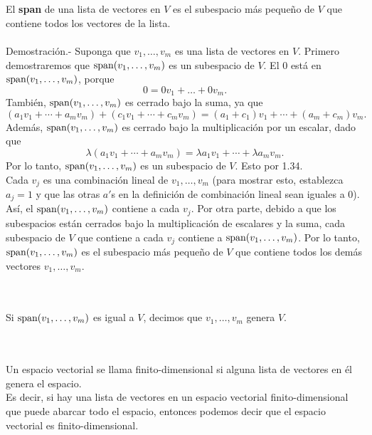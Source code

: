 \setcounter{myteo}{6}
\begin{myteo}\,\\\\
    El \textbf{span} de una lista de vectores en $V$ es el subespacio más pequeño de $V$ que contiene todos los vectores de la lista.\\\\
	Demostración.-\; Suponga que $v_1,\ldots,v_m$ es una lista de vectores en $V$. Primero demostraremos que $\mathop{\mbox{\normalfont span}}\nolimits(v_1,\ldots,v_m)$ es un subespacio de $V$. El $0$ está en $\mathop{\mbox{\normalfont span}}\nolimits(v_1,\ldots,v_m)$, porque
	$$0=0v_1+\ldots + 0v_m.$$
	También, $\mathop{\mbox{\normalfont span}}\nolimits(v_1,\ldots,v_m)$ es cerrado bajo la suma, ya que
	$$(a_1v_1+\cdots + a_mv_m)+(c_1v_1+\cdots+c_mv_m)=(a_1+c_1)v_1+\cdots + (a_m+c_m)v_m.$$
	Además, $\mathop{\mbox{\normalfont span}}\nolimits(v_1,\ldots,v_m)$ es cerrado bajo la multiplicación por un escalar, dado que
	$$\lambda(a_1v_1+\cdots + a_mv_m)=\lambda a_1v_1+\cdots + \lambda a_mv_m.$$
	Por lo tanto, $\mathop{\mbox{\normalfont span}}\nolimits(v_1,\ldots, v_m)$ es un subespacio de $V$. Esto por 1.34.\\

	Cada $v_j$ es una combinación lineal de $v_1,\ldots,v_m$  (para mostrar esto, establezca $a_j=1$ y que las otras $a'$s en la definición de combinación lineal sean iguales a $0$). Así, el $\mathop{\mbox{\normalfont span}}\nolimits(v_1,\ldots,v_m)$ contiene a cada $v_j$. Por otra parte, debido a que los subespacios están cerrados bajo la multiplicación de escalares y la suma, cada subespacio de $V$ que contiene a cada $v_j$ contiene a $\mathop{\mbox{\normalfont span}}\nolimits(v_1,\ldots,v_m)$. Por lo tanto, $\mathop{\mbox{\normalfont span}}\nolimits(v_1,\ldots,v_m)$ es el subespacio más pequeño de $V$ que contiene todos los demás vectores $v_1,\ldots,v_m$.
\end{myteo}

\begin{mydef}[Spans]\,\\\\
    Si $\mathop{\mbox{\normalfont span}}\nolimits(v_1,\ldots,v_m)$ es igual a $V$, decimos que $v_1,\ldots, v_m$ genera $V$.
\end{mydef}

\setcounter{mydef}{9}
\begin{mydef}\,\\\\
    Un espacio vectorial se llama finito-dimensional si alguna lista de vectores en él genera el espacio.\\

    Es decir, si hay una lista de vectores en un espacio vectorial finito-dimensional que puede abarcar todo el espacio, entonces podemos decir que el espacio vectorial es finito-dimensional.
\end{mydef}

